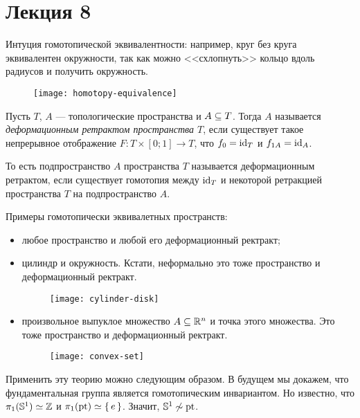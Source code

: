 \documentclass[main]{subfiles}
\begin{document}
\section{Лекция 8}

Интуция гомотопической эквивалентности: например, круг без круга эквивалентен окружности, так как можно
<<схлопнуть>> кольцо вдоль радиусов и получить окружность.

\begin{figure}[H]
	\centering \texttt{[image: homotopy-equivalence]}
\end{figure}

\begin{definition}
	Пусть $ T $, $ A $ --- топологические пространства и $ A \subseteq T $. Тогда $ A $ называется \emph{деформационным
	ретрактом пространства $ T $}, если существует такое непрерывное отображение $ F \colon T \times [0; 1] \to T $,
	что $ f_0 = \operatorname{id}_T $ и $ f_{1 A} = \operatorname{id}_A $.
\end{definition}

\begin{remark}
	То есть подпространство $ A $ пространства $ T $ называется деформационным ретрактом, если существует гомотопия
	между $ \operatorname{id}_T $ и некоторой ретракцией пространства $ T $ на подпространство $ A $.
\end{remark}

\begin{example} Примеры гомотопически эквивалетных пространств:
	\begin{itemize}
		\item любое пространство и любой его деформационный ректракт;
		\item цилиндр и окружность. Кстати, неформально это тоже пространство и деформационный ректракт.
			\begin{figure}[H]
				\centering \texttt{[image: cylinder-disk]}
			\end{figure}
		\item произвольное выпуклое множество $ A \subseteq \mathbb{R}^n $ и точка этого множества. Это тоже пространство и
			деформационный ректракт.
			\begin{figure}[H]
				\centering \texttt{[image: convex-set]}
			\end{figure}
	\end{itemize}
\end{example}

\begin{example}
	Применить эту теорию можно следующим образом. В будущем мы докажем, что фундаментальная группа является
	гомотопическим инвариантом. Но известно, что $ \pi_1(\mathbb{S}^1) \simeq \mathbb{Z} $ и $ \pi_1(\operatorname{pt}) \simeq \left\{\,e\,\right\} $.
	Значит, $ \mathbb{S}^1 \not \sim \operatorname{pt} $.
\end{example}
\end{document}
